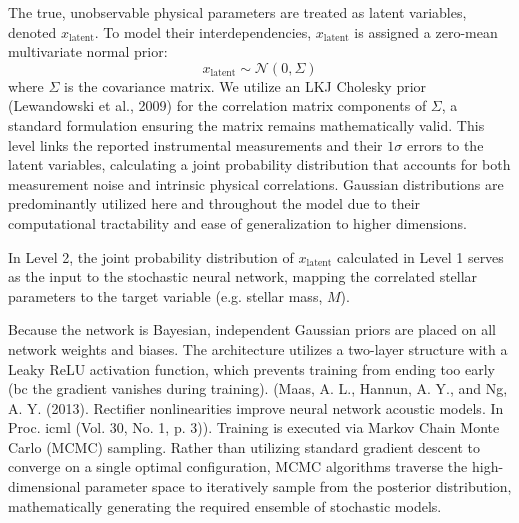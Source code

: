 The true, unobservable physical parameters are treated as latent variables, denoted $x_{\mathrm{latent}}$. To model their interdependencies, $x_{\mathrm{latent}}$ is assigned a zero-mean multivariate normal prior:
\begin{equation}
    x_{\mathrm{latent}} \sim \mathcal{N}(0, \Sigma)
\end{equation}
where $\Sigma$ is the covariance matrix. We utilize an LKJ Cholesky prior (Lewandowski et al., 2009) for the correlation matrix components of $\Sigma$, a standard formulation ensuring the matrix remains mathematically valid. This level links the reported instrumental measurements and their $1\sigma$ errors to the latent variables, calculating a joint probability distribution that accounts for both measurement noise and intrinsic physical correlations. Gaussian distributions are predominantly utilized here and throughout the model due to their computational tractability and ease of generalization to higher dimensions.

In Level 2, the joint probability distribution of $x_{\mathrm{latent}}$ calculated in Level 1 serves as the input to the stochastic neural network, mapping the correlated stellar parameters to the target variable (e.g. stellar mass, $M$). 

Because the network is Bayesian, independent Gaussian priors are placed on all network weights and biases. The architecture utilizes a two-layer structure with a Leaky ReLU activation function, which prevents training from ending too early (bc the gradient vanishes during training). (Maas, A. L., Hannun, A. Y., and Ng, A. Y. (2013). Rectifier nonlinearities improve neural network acoustic models. In Proc. icml (Vol. 30, No. 1, p. 3)). 
Training is executed via Markov Chain Monte Carlo (MCMC) sampling. Rather than utilizing standard gradient descent to converge on a single optimal configuration, MCMC algorithms traverse the high-dimensional parameter space to iteratively sample from the posterior distribution, mathematically generating the required ensemble of stochastic models.

\fi




